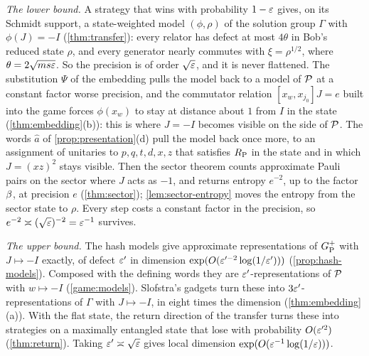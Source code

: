 \emph{The lower bound.} A strategy that wins with probability $1-\varepsilon$ gives, on its Schmidt support, a state-weighted model $(\phi,\rho)$
of the solution group $\Gamma$ with $\phi(J)=-I$ (\cref{thm:transfer}): every relator has defect at most $4\theta$ in Bob's reduced state
$\rho$, and every generator nearly commutes with $\xi=\rho^{1/2}$, where $\theta=2\sqrt{ms\varepsilon}$. So the precision is of order $\sqrt{\varepsilon}$, and it
is never flattened. The substitution $\Psi$ of the embedding pulls the model back to a model of $\mathcal P$ at a constant factor worse
precision, and the commutator relation $[x_w,x_{j_0}]J=e$ built into the game forces $\phi(x_w)$ to stay at distance about $1$ from $I$ in
the state (\cref{thm:embedding}(b)): this is where $J=-I$ becomes visible on the side of $\mathcal P$. The words $\hat a$ of
\cref{prop:presentation}(d) pull the model back once more, to an assignment of unitaries to $p,q,t,d,x,z$ that satisfies $R_{\mathrm P}$ in the state
and in which $J=(xz)^2$ stays visible. Then the sector theorem counts approximate Pauli pairs on the sector where $J$ acts as $-1$, and
returns entropy $e^{-2}$, up to the factor $\beta$, at precision $e$ (\cref{thm:sector}); \cref{lem:sector-entropy} moves the entropy from
the sector state to $\rho$. Every step costs a constant factor in the precision, so $e^{-2}\asymp(\sqrt{\varepsilon})^{-2}=\varepsilon^{-1}$ survives.

\emph{The upper bound.} The hash models give approximate representations of $G_{\mathrm P}^{+}$ with $J\mapsto-I$ exactly, of defect $\varepsilon'$ in
dimension $\exp(O(\varepsilon'^{-2}\log(1/\varepsilon')))$ (\cref{prop:hash-models}). Composed with the defining words they are $\varepsilon'$-representations of
$\mathcal P$ with $w\mapsto-I$ (\cref{game:models}). Slofstra's gadgets turn these into $3\varepsilon'$-representations of $\Gamma$ with $J\mapsto-I$, in
eight times the dimension (\cref{thm:embedding}(a)). With the flat state, the return direction of the transfer turns these into strategies
on a maximally entangled state that lose with probability $O(\varepsilon'^2)$ (\cref{thm:return}). Taking $\varepsilon'\asymp\sqrt{\varepsilon}$ gives local
dimension $\exp(O(\varepsilon^{-1}\log(1/\varepsilon)))$.

